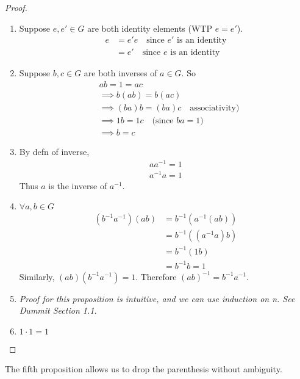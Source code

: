 \documentclass[11pt, oneside]{book}
\theoremstyle{break}
\newtheorem*{proof}{Proof}
\begin{document}
\begin{proof}
    \begin{enumerate}
        \item Suppose $e, e' \in G$ are both identity elements (WTP $e = e'$). 
            \begin{align*}
                e &= e' e \quad \text{since $e'$ is an identity} \\
                  &= e' \quad \text{since $e$ is an identity}
            \end{align*}
        \item Suppose $b, c \in G$ are both inverses of $a \in G$. So
            \begin{align*}
                &ab = 1 = ac \\
                &\implies b(ab) = b(ac) \\
                &\implies (ba)b = (ba)c \quad \text{associativity)} \\
                &\implies 1b = 1c \quad \text{(since $ba = 1$)} \\
                &\implies b = c
            \end{align*}
        \item By defn of inverse,
            \begin{gather*}
                aa^{-1} = 1 \\
                a^{-1}a = 1
            \end{gather*}
            Thus $a$ is the inverse of $a^{-1}$.
        \item $\forall a, b \in G$
            \begin{align*}
                (b^{-1}a^{-1})(ab) &= b^{-1}(a^{-1}(ab)) \\
                                   &= b^{-1}((a^{-1}a)b) \\
                                   &= b^{-1}(1b) \\
                                   &= b^{-1}b = 1
            \end{align*}
            Similarly, $(ab)(b^{-1}a^{-1}) = 1$. Therefore $(ab)^{-1} = b^{-1}a^{-1}$.
        \item \textit{Proof for this proposition is intuitive, and we can use induction on n. See Dummit Section 1.1.}
        \item $1 \cdot 1 = 1$
    \end{enumerate}
\end{proof}

The fifth proposition allows us to drop the parenthesis without ambiguity.
\end{document}
